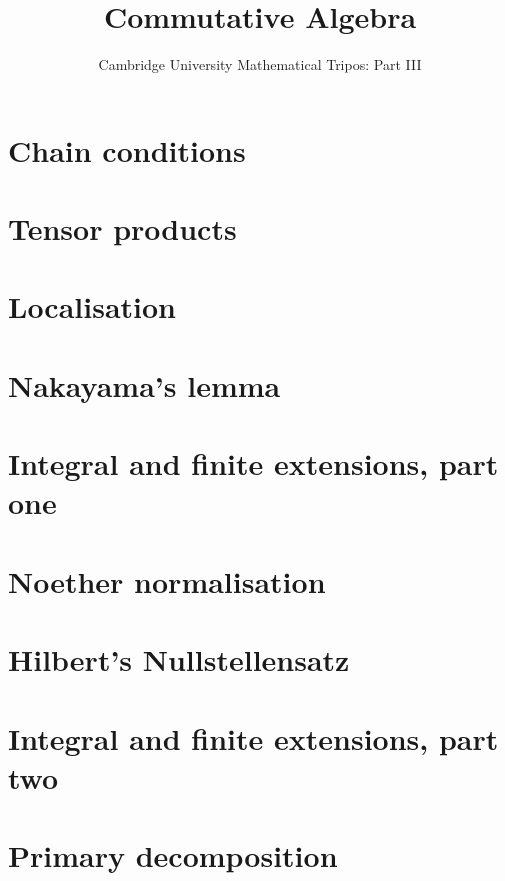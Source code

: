 \documentclass{article}
\title{Commutative Algebra}
\author{Cambridge University Mathematical Tripos: Part III}
\begin{document}
\maketitle

\tableofcontentsnewpage{}

\section{Chain conditions}

\section{Tensor products}

\section{Localisation}

\section{Nakayama's lemma}

\section{Integral and finite extensions, part one}

\section{Noether normalisation}

\section{Hilbert's Nullstellensatz}

\section{Integral and finite extensions, part two}

\section{Primary decomposition}

\end{document}
